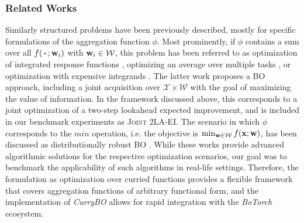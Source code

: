 \subsubsection{Related Works} \label{subsubsec:related_work}
Similarly structured problems have been previously described, mostly for specific formulations of the aggregation function $\phi$. Most prominently, if $\phi$ contains a sum over all $f(\,\boldsymbol{\cdot}\,; {\mathbf{w}}_i)$ with ${\mathbf{w}}_i \in {\mathcal{W}}$, this problem has been referred to as optimization of integrated response functions \citep{williams_sequential_2000}, optimizing an average over multiple tasks \citep{swersky_multi-task_2013}, or optimization with expensive integrands \citep{toscano-palmerin_bayesian_2018}. 
The latter work proposes a BO approach, including a joint acquisition over $\mathcal{X} \times \mathcal{W}$ with the goal of maximizing the value of information. 
In the framework discussed above, this corresponds to a joint optimization of a two-step lookahead expected improvement, and is included in our benchmark experiments as \textsc{Joint 2LA-EI}.
The scenario in which $\phi$ corresponds to the $min$ operation, i.e. the objective is $\min_{{\mathbf{w}} \in \mathcal{W}} f({\mathbf{x}}; {\mathbf{w}})$, has been discussed as distributionally robust BO \citep{bogunovic_adversarially_2018, kirschner_distributionally_2020, nguyen_distributionally_2020, husain_distributionally_2023}. 
While these works provide advanced algorithmic solutions for the respective optimization scenarios, our goal was to benchmark the applicability of such algorithms in real-life settings. 
Therefore, the formulation as optimization over curried functions provides a flexible framework that covers aggregation functions of arbitrary functional form, and the implementation of \textit{CurryBO} allows for rapid integration with the \textit{BoTorch} ecosystem.

